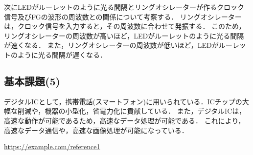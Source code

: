 \documentclass{ltjsarticle}
\begin{document}
\vspace{\baselineskip}
次にLEDがルーレットのように光る間隔とリングオシレーターが作るクロック信号及びFGの波形の周波数との関係について考察する．
リングオシレーターは，クロック信号を入力すると，その周波数に合わせて発振する．
このため，リングオシレーターの周波数が高いほど，LEDがルーレットのように光る間隔が速くなる．
また，リングオシレーターの周波数が低いほど，LEDがルーレットのように光る間隔が遅くなる．

\subsection{基本課題(5)}
デジタルICとして，携帯電話(スマートフォン)に用いられている．ICチップの大幅な削減や，機器の小型化，省電力化に貢献している．
また，デジタルICは，高速な動作が可能であるため，高速なデータ処理が可能である．
これにより，高速なデータ通信や，高速な画像処理が可能になっている．

\begin{thebibliography}{9}
 \url{https://example.com/reference1}
\end{thebibliography}
\end{document}
